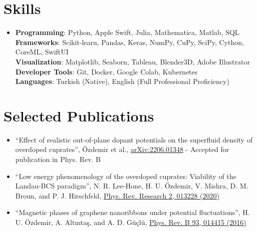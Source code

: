 \documentclass[letterpaper,11pt]{article}
\begin{document}
\section{Skills}
 \begin{itemize}[leftmargin=0.15in, label={}]
    \item{
     \textbf{Programming}{: Python, Apple Swift, Julia, Mathematica, Matlab, SQL} \\
     \vspace{5pt}
     \textbf{Frameworks}{: Scikit-learn, Pandas, Keras, NumPy, CuPy, SciPy, Cython, CoreML, SwiftUI} \\
     \vspace{5pt}
     \textbf{Visualization}{: Matplotlib, Seaborn, Tableau, Blender3D, Adobe Illustrator} \\
     \vspace{5pt}
     \textbf{Developer Tools}{: Git, Docker, Google Colab, Kubernetes} \\
     \vspace{5pt}
     \textbf{Languages}{: Turkish (Native), English (Full Professional Proficiency)}
    }
 \end{itemize}

 \section{Selected Publications}
 \begin{itemize}[leftmargin=0.15in, label={}]
    \item{
      ``Effect of realistic out-of-plane dopant potentials on the superfluid density of overdoped cuprates'', Özdemir et al., \href{https://arxiv.org/abs/2206.01348}{arXiv:2206.01348} - Accepted for publication in Phys. Rev. B
    }
    \item{
       ``Low energy phenomenology of the overdoped cuprates: Viability of the Landau-BCS paradigm'', N. R. Lee-Hone, H. U. Özdemir, V. Mishra, D. M. Broun, and P. J. Hirschfeld, \href{https://journals.aps.org/prresearch/abstract/10.1103/PhysRevResearch.2.013228}{Phys. Rev. Research 2, 013228 (2020)
    }}
    \item{
       ``Magnetic phases of graphene nanoribbons under potential fluctuations'', H. U. Özdemir, A. Altıntaş, and A. D. Güçlü, \href{https://journals.aps.org/prb/abstract/10.1103/PhysRevB.93.014415}{Phys. Rev. B 93, 014415 (2016)}
    }
    
 \end{itemize}
 
\end{document}
